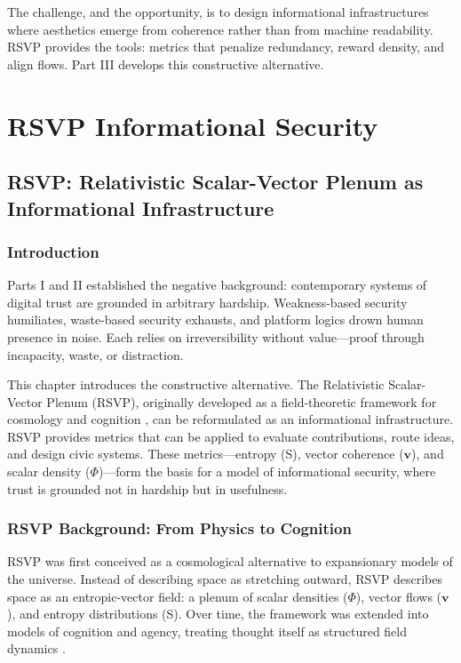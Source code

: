 \documentclass{book}
\begin{document}
The challenge, and the opportunity, is to design informational infrastructures where aesthetics emerge from coherence rather than from machine readability. RSVP provides the tools: metrics that penalize redundancy, reward density, and align flows. Part III develops this constructive alternative.

\part{RSVP Informational Security}

\chapter{RSVP: Relativistic Scalar-Vector Plenum as Informational Infrastructure}

\section{Introduction}

Parts I and II established the negative background: contemporary systems of digital trust are grounded in arbitrary hardship. Weakness-based security humiliates, waste-based security exhausts, and platform logics drown human presence in noise. Each relies on irreversibility without value—proof through incapacity, waste, or distraction.

This chapter introduces the constructive alternative. The Relativistic Scalar-Vector Plenum (RSVP), originally developed as a field-theoretic framework for cosmology and cognition \cite{prigogine1984}, can be reformulated as an informational infrastructure. RSVP provides metrics that can be applied to evaluate contributions, route ideas, and design civic systems. These metrics—entropy (S), vector coherence (\(\mathbf{v}\)), and scalar density (\(\Phi\))—form the basis for a model of informational security, where trust is grounded not in hardship but in usefulness.

\section{RSVP Background: From Physics to Cognition}

RSVP was first conceived as a cosmological alternative to expansionary models of the universe. Instead of describing space as stretching outward, RSVP describes space as an entropic-vector field: a plenum of scalar densities (\(\Phi\)), vector flows (\(\mathbf{v}\)), and entropy distributions (S). Over time, the framework was extended into models of cognition and agency, treating thought itself as structured field dynamics \cite{barandes2023}.
\end{document}
